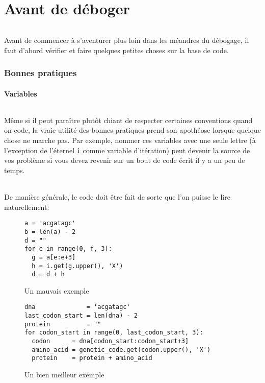 \part{Avant de déboger}%
\label{part:before}

\paragraph{} Avant de commencer à s'aventurer plus loin dans les méandres du
débogage, il faut d'abord vérifier et faire quelques petites choses sur la base
de code.

\section{Bonnes pratiques}

\subsection{Variables}

\paragraph{} Même si il peut paraître plutôt chiant de respecter certaines
conventions quand on code, la vraie utilité des bonnes pratiques prend son
apothéose lorsque quelque chose ne marche pas. Par exemple, nommer ces
variables avec une seule lettre (à l'exception de l'éternel \texttt{i} comme
variable d'itération) peut devenir la source de vos problème si vous devez
revenir sur un bout de code écrit il y a un peu de temps.

\paragraph{} De manière générale, le code doit être fait de sorte que l'on
puisse le lire naturellement:

\begin{figure}[H]
	\centering
	\begin{verbatim}
a = 'acgatagc'
b = len(a) - 2
d = ""
for e in range(0, f, 3):
  g = a[e:e+3]
  h = i.get(g.upper(), 'X')
  d = d + h
	\end{verbatim}
	\caption{Un mauvais exemple}
\end{figure}

\begin{figure}[H]
	\centering
	\begin{verbatim}
dna              = 'acgatagc'
last_codon_start = len(dna) - 2
protein          = ""
for codon_start in range(0, last_codon_start, 3):
  codon      = dna[codon_start:codon_start+3]
  amino_acid = genetic_code.get(codon.upper(), 'X')
  protein    = protein + amino_acid
	\end{verbatim}
	\caption{Un bien meilleur exemple}
\end{figure}

